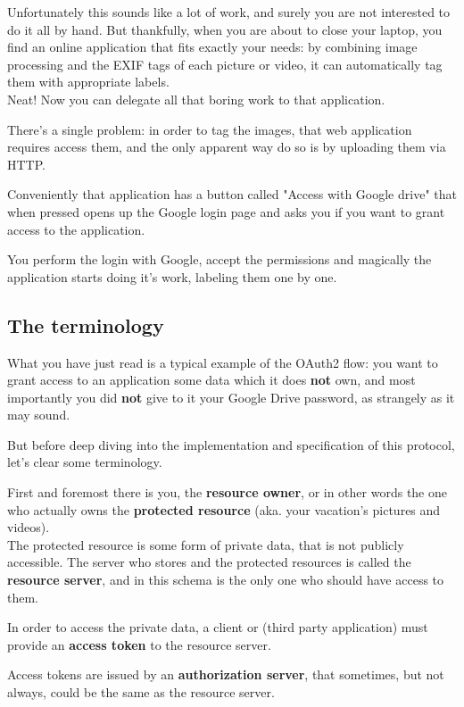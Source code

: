 Unfortunately this sounds like a lot of work, and surely you are not interested
to do it all by hand.  But thankfully, when you are about to close your laptop,
you find an online application that fits exactly your needs: by combining image
processing and the EXIF tags of each picture or video, it can automatically tag
them with appropriate labels.
\\
Neat!  Now you can delegate all that boring work to that application.

There's a single problem: in order to tag the images, that web application
requires access them, and the only apparent way do so is by uploading them via
HTTP.

Conveniently that application has a button called "Access with Google drive"
that when pressed opens up the Google login page and asks you if you want to
grant access to the application.

You perform the login with Google, accept the permissions and magically the
application starts doing it's work, labeling them one by one.

\subsection{The terminology}
What you have just read is a typical example of the OAuth2 flow:
you want to grant access to an application some data which it does \textbf{not} own,
and most importantly you did \textbf{not} give to it your Google Drive
password, as strangely as it may sound.

But before deep diving into the implementation and specification of this protocol, let's clear
some terminology.

First and foremost there is you, the \textbf{resource owner}, or in other words the one who
actually owns the \textbf{protected resource} (aka. your vacation's pictures and videos).
\\
The protected resource is some form of private data, that is not
publicly accessible.  The server who stores and the protected resources is
called the \textbf{resource server}, and in this schema is the only one who
should have access to them.

In order to access the private data, a client or (third party application) must
provide an \textbf{access token} to the resource server.

Access tokens are issued by an \textbf{authorization server}, that sometimes,
but not always, could be the same as the resource server.


